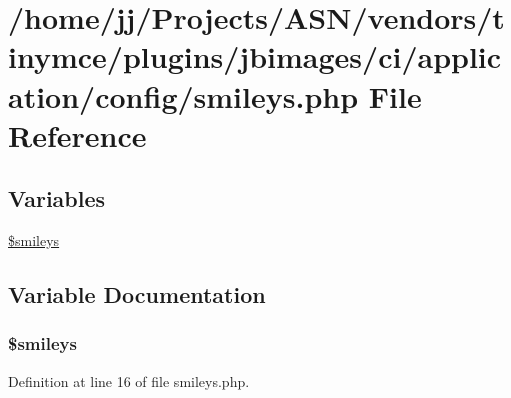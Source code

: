 \hypertarget{smileys_8php}{}\section{/home/jj/\+Projects/\+A\+S\+N/vendors/tinymce/plugins/jbimages/ci/application/config/smileys.php File Reference}
\label{smileys_8php}
\subsection*{Variables}
\begin{DoxyCompactItemize}
\item 
\hyperlink{smileys_8php_a3f21d1c0fb54cb2010e7c7004f29f74c}{\$smileys}
\end{DoxyCompactItemize}


\subsection{Variable Documentation}
\subsubsection[{\texorpdfstring{\$smileys}{$smileys}}]{\setlength{\rightskip}{0pt plus 5cm}\$smileys}\hypertarget{smileys_8php_a3f21d1c0fb54cb2010e7c7004f29f74c}{}\label{smileys_8php_a3f21d1c0fb54cb2010e7c7004f29f74c}


Definition at line 16 of file smileys.\+php.

